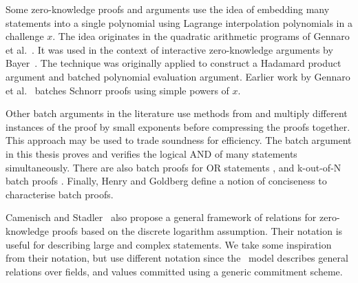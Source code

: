 Some zero-knowledge proofs and arguments use the idea of embedding many statements into a single polynomial using Lagrange interpolation polynomials in a challenge $x$. The idea originates in the quadratic arithmetic programs of Gennaro et al.~\cite{Gennaro2013}. It was used in the context of interactive zero-knowledge arguments by Bayer~\cite{Bayer2014}. The technique was originally applied to construct a Hadamard product argument and batched polynomial evaluation argument. Earlier work by Gennaro et al.~\cite{Gennaro2004} batches Schnorr proofs using simple powers of $x$.

Other batch arguments in the literature use methods from \cite{Bellare1998} and multiply different instances of the proof by small exponents before compressing the proofs together. This approach may be used to trade soundness for efficiency. The batch argument in this thesis proves and verifies the logical AND of many statements simultaneously. There are also batch proofs for OR statements \cite{eng2009}, and k-out-of-N batch proofs \cite{Henry2013}. Finally, Henry and Goldberg \cite{Henry2013} define a notion of conciseness to characterise batch proofs.

Camenisch and Stadler~\cite{Camenisch1997} also propose a general framework of relations for zero-knowledge proofs based on the discrete logarithm assumption. Their notation is useful for describing large and complex statements. We take some inspiration from their notation, but use different notation since the \ILC\ model describes general relations over fields, and values committed using a generic commitment scheme.